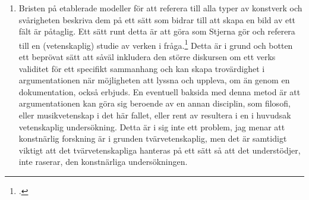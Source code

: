 \documentclass[11pt]{article}
\begin{document}
\begin{enumerate}
  \item Bristen på etablerade modeller för att referera till alla
    typer av konstverk och svårigheten beskriva dem på ett sätt som
    bidrar till att skapa en bild av ett fält är påtaglig. Ett sätt
    runt detta är att göra som Stjerna gör och referera till en
    (vetenskaplig) studie av verken i fråga.\footcite[Se
    t.ex. referenser till Cox och LaBelle: ][sid. 45]{Stjerna2018} Detta
    är i grund och botten ett beprövat sätt att såväl inkludera den
    större diskursen om ett verks validitet för ett specifikt
    sammanhang och kan skapa trovärdighet i argumentationen när
    möjligheten att lyssna och uppleva, om än genom en dokumentation,
    också erbjuds. En eventuell baksida med denna metod är att
    argumentationen kan göra sig beroende av en annan disciplin, som
    filosofi, eller musikvetenskap i det här fallet, eller rent av
    resultera i en i huvudsak vetenskaplig undersökning. Detta är i
    sig inte ett problem, jag menar att konstnärlig forskning är i
    grunden tvärvetenskaplig, men det är samtidigt viktigt att det
    tvärvetenskapliga hanteras på ett sätt så att det understödjer, inte
    raserar, den konstnärliga undersökningen.


\end{enumerate}
\end{document}
